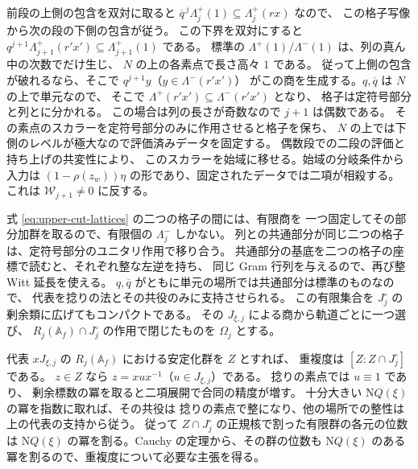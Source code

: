 前段の上側の包含を双対に取ると
\(\overline q^{\,j}\Lambda_j^+(1)\subseteq\Lambda_j^+(r x)\) なので、
この格子写像から次の段の下側の包含が従う。
この下界を双対にすると \(q^{j+1}\Lambda_{j+1}^+(r'x')\subseteq
\Lambda_{j+1}^+(1)\) である。
標準の \(\Lambda^+(1)/\Lambda^-(1)\) は、列の真ん中の次数でだけ生じ、
\(N\) の上の各素点で長さ高々 \(1\) である。
従って上側の包含が破れるなら、そこで \(q^{j+1}y\)（\(y\in\Lambda^-(r'x')\)）
がこの商を生成する。\(q,\overline q\) は \(N\) の上で単元なので、
そこで \(\Lambda^+(r'x')\subseteq\Lambda^-(r'x')\) となり、
格子は定符号部分と列とに分かれる。
この場合は列の長さが奇数なので \(j+1\) は偶数である。
その素点のスカラーを定符号部分のみに作用させると格子を保ち、
\(N\) の上では下側のレベルが極大なので評価済みデータを固定する。
偶数段での二段の評価と持ち上げの共変性により、
このスカラーを始域に移せる。始域の分岐条件から入力は
\((1-\rho(z_w))\eta\) の形であり、固定されたデータでは二項が相殺する。
これは \(\mathcal W_{j+1}\ne0\) に反する。

式 \eqref{eq:upper-cut-lattices} の二つの格子の間には、有限商を
一つ固定してその部分加群を取るので、有限個の \(\Lambda_j^-\) しかない。
列との共通部分が同じ二つの格子は、定符号部分のユニタリ作用で移り合う。
共通部分の基底を二つの格子の座標で読むと、それぞれ整な左逆を持ち、
同じ Gram 行列を与えるので、再び整 Witt 延長を使える。
\(q,\overline q\) がともに単元の場所では共通部分は標準のものなので、
代表を捻りの法とその共役のみに支持させられる。
この有限集合を \(J^\circ_j\) の剰余類に広げてもコンパクトである。
その \(J_{\xi,j}\) による商から軌道ごとに一つ選び、
\(R_j(\mathbb A_f)\cap J^\circ_j\) の作用で閉じたものを \(\Omega_j\) とする。

代表 \(xJ_{\xi,j}\) の \(R_j(\mathbb A_f)\) における安定化群を \(Z\) とすれば、
重複度は \([Z:Z\cap J^\circ_j]\) である。
\(z\in Z\) なら \(z=x u x^{-1}\)（\(u\in J_{\xi,j}\)）である。
捻りの素点では \(u\equiv1\) であり、
剰余標数の冪を取ると二項展開で合同の精度が増す。
十分大きい \(\mathrm NQ(\xi)\) の冪を指数に取れば、その共役は
捻りの素点で整になり、他の場所での整性は上の代表の支持から従う。
従って \(Z\cap J^\circ_j\) の正規核で割った有限群の各元の位数は
\(\mathrm NQ(\xi)\) の冪を割る。Cauchy の定理から、その群の位数も
\(\mathrm NQ(\xi)\) のある冪を割るので、重複度について必要な主張を得る。

